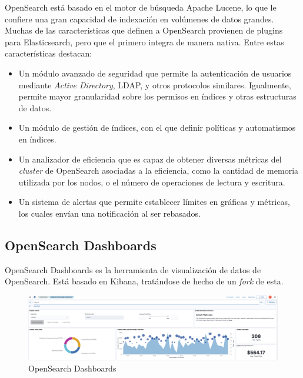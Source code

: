 OpenSearch está basado en el motor de búsqueda Apache Lucene, lo que le confiere una gran capacidad de indexación en volúmenes de datos grandes. Muchas de las características que definen a OpenSearch provienen de plugins para Elasticsearch, pero que el primero integra de manera nativa. Entre estas características destacan:

\begin{itemize}
    \item Un módulo avanzado de seguridad que permite la autenticación de usuarios mediante \emph{Active Directory}, LDAP, y otros protocolos similares. Igualmente, permite mayor granularidad sobre los permisos en índices y otras estructuras de datos.
    \item Un módulo de gestión de índices, con el que definir políticas y automatismos en índices.
    \item Un analizador de eficiencia que es capaz de obtener diversas métricas del \emph{cluster} de OpenSearch asociadas a la eficiencia, como la cantidad de memoria utilizada por los nodos, o el número de operaciones de lectura y escritura.
    \item Un sistema de alertas que permite establecer límites en gráficas y métricas, los cuales envían una notificación al ser rebasados.
\end{itemize}

\subsection{OpenSearch Dashboards}

OpenSearch Dashboards es la herramienta de visualización de datos de OpenSearch. Está basado en Kibana, tratándose de hecho de un \emph{fork} de esta. \emph{\parencite{Reference18}}

\begin{figure}[ht]
    \centering
    \includegraphics[width=\textwidth]{Figures/opensearch-dashboards}
    \decoRule
    \caption[OpenSearch Dashboards]{OpenSearch Dashboards \emph{\parencite{Reference18}}}
    \label{fig:opensearch-dashboards}
\end{figure}


